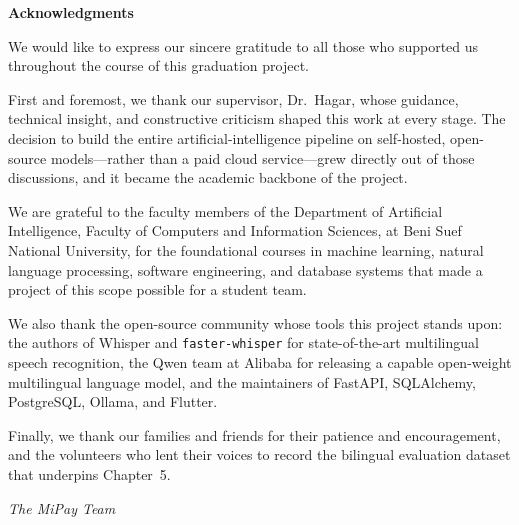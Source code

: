 \begin{center}
    \huge \textbf{Acknowledgments}
\end{center}

\vspace{0.5cm}

\large
\noindent
We would like to express our sincere gratitude to all those who supported us
throughout the course of this graduation project.

First and foremost, we thank our supervisor, Dr.~Hagar, whose guidance,
technical insight, and constructive criticism shaped this work at every stage.
The decision to build the entire artificial-intelligence pipeline on
self-hosted, open-source models---rather than a paid cloud service---grew
directly out of those discussions, and it became the academic backbone of the
project.

We are grateful to the faculty members of the Department of Artificial
Intelligence, Faculty of Computers and Information Sciences, at Beni Suef
National University, for the foundational courses in machine learning, natural
language processing, software engineering, and database systems that made a
project of this scope possible for a student team.

We also thank the open-source community whose tools this project stands upon:
the authors of Whisper and \texttt{faster-whisper} for state-of-the-art
multilingual speech recognition, the Qwen team at Alibaba for releasing a
capable open-weight multilingual language model, and the maintainers of FastAPI,
SQLAlchemy, PostgreSQL, Ollama, and Flutter.

Finally, we thank our families and friends for their patience and
encouragement, and the volunteers who lent their voices to record the bilingual
evaluation dataset that underpins Chapter~5.

\vspace{1cm}
\normalsize
\noindent\textit{The MiPay Team}
